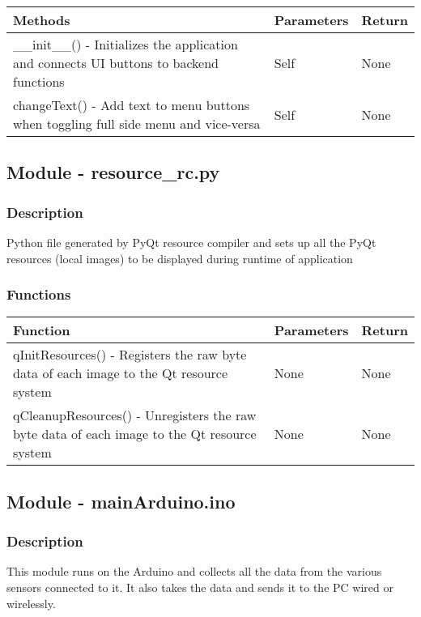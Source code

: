 \documentclass[12pt, titlepage]{article}
\begin{document}
    \noindent \begin{tabular}{| p{} | p{}| p{}|}
      \hline
      \rowcolor[gray]{0.9}
      Methods & Parameters & Return\\
      \hline
      \_\_init\_\_() - Initializes the application and connects UI buttons to backend functions &  Self & None \\
      \hline
      changeText() - Add text to menu buttons when toggling full side menu and vice-versa & Self & None \\
      \hline
    \end{tabular}

  \subsection{Module - resource\_rc.py}

  \subsubsection{Description}
  Python file generated by PyQt resource compiler and sets up all the PyQt resources (local images) to be displayed during runtime of application
  

  \subsubsection{Functions}
  
    \noindent \begin{tabular}{| p{} | p{}| p{}|}
      \hline
      \rowcolor[gray]{0.9}
      Function & Parameters & Return\\
      \hline
      qInitResources() - Registers the raw byte data of each image to the Qt resource system &  None & None \\
      \hline
      qCleanupResources() - Unregisters the raw byte data of each image to the Qt resource system & None & None \\
      \hline
    \end{tabular}

\newpage
    \subsection{Module - mainArduino.ino}

    \subsubsection{Description}
    This module runs on the Arduino and collects all the data from the various sensors connected to it. It also takes the data and sends it to the PC wired or wirelessly.
    
\end{document}
